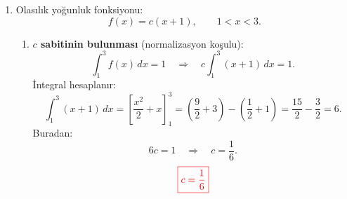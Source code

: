 \documentclass[12pt,a4paper]{article}
\begin{document}
\begin{enumerate}
\begin{center}
\end{center}

\begin{enumerate}
\item \textbf{Toplam hata olasılığı $P(H)$:} \\
Hatalı bir parça ya A'dan ya da B'den gelmiş olmalıdır:
\[
P(H)=P(H\mid A)P(A)+P(H\mid B)P(B)
\]
\[
P(H)=0.05\cdot0.60+0.10\cdot0.40=0.030+0.040=0.070.
\]
\[
{\color{red}\boxed{P(H)=0.07}}
\]

\item \textbf{Bayes teoremi ile $P(B\mid H)$:} \\
Hatalı olduğu bilinen parçanın B'den gelme olasılığı:
\[
P(B\mid H)=\frac{P(H\mid B)\,P(B)}{P(H)}=\frac{0.10\cdot0.40}{0.070}=\frac{0.040}{0.070}=\frac{4}{7}\approx 0.5714.
\]
\[
{\color{red}\boxed{P(B\mid H)=\frac{4}{7}\approx 0.5714}}
\]
\end{enumerate}

\item Olasılık yoğunluk fonksiyonu:
\[
f(x)=c(x+1),\qquad 1<x<3.
\]

\begin{enumerate}
\item \textbf{$c$ sabitinin bulunması} (normalizasyon koşulu):
\[
\int_{1}^{3}f(x)\,dx=1
\quad\Rightarrow\quad
c\int_{1}^{3}(x+1)\,dx=1.
\]
İntegral hesaplanır:
\[
\int_{1}^{3}(x+1)\,dx=\left[\frac{x^2}{2}+x\right]_{1}^{3}
=\left(\frac{9}{2}+3\right)-\left(\frac{1}{2}+1\right)=\frac{15}{2}-\frac{3}{2}=6.
\]
Buradan:
\[
6c=1\quad\Rightarrow\quad c=\frac{1}{6}.
\]
\[
{\color{red}\boxed{c=\frac{1}{6}}}
\]


\end{enumerate}
\end{enumerate}
\end{document}
